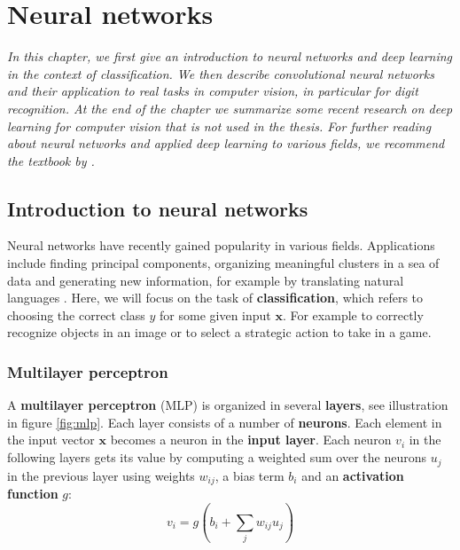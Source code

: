 

\chapter{Neural networks}
\label{sec:networks}
\textit{
In this chapter, we first give an introduction to neural networks and deep learning in the context of classification. We then describe convolutional neural networks and their application to real tasks in computer vision, in particular for digit recognition. At the end of the chapter we summarize some recent research on deep learning for computer vision that is not used in the thesis.
For further reading about neural networks and applied deep learning to various fields, we recommend the textbook by \textcite{GoodfellowBook}.
}

\section{Introduction to neural networks}

Neural networks have recently gained popularity in various fields.
Applications include finding principal components, organizing meaningful clusters in a sea of data and generating new information, for example by translating natural languages \cite{machine_translation_attention}. Here, we will focus on the task of \textbf{classification}, which refers to choosing the correct class $y$ for some given input $\mathbf{x}$. For example to correctly recognize objects in an image or to select a strategic action to take in a game.

\subsection{Multilayer perceptron}



A \textbf{multilayer perceptron} (MLP) is organized in several \textbf{layers}, see illustration in figure \ref{fig:mlp}. Each layer consists of a number of \textbf{neurons}.
Each element in the input vector $\mathbf{x}$ becomes a neuron in the \textbf{input layer}. Each neuron $v_i$ in the following layers gets its value by computing a weighted sum over the neurons $u_j$ in the previous layer using weights  $w_{ij}$, a bias term $b_i$ and an \textbf{activation function} $g$:
\[
v_i = g\left( b_i + \sum_j w_{ij} u_j \right)
\]

